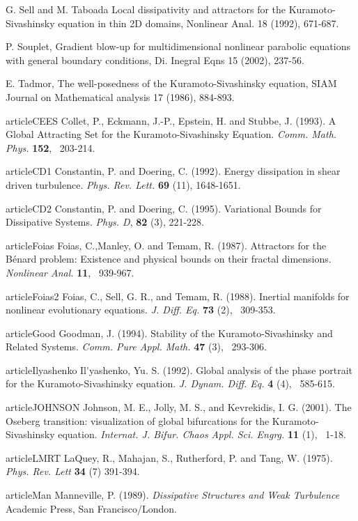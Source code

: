 G. Sell and M. Taboada Local dissipativity and attractors for the Kuramoto-Sivashinsky equation in thin 2D domains, Nonlinear Anal. 18 (1992), 671-687.

P. Souplet, Gradient blow-up for multidimensional nonlinear parabolic equations with general boundary conditions, Di. Inegral Eqns 15 (2002), 237-56.

E. Tadmor, The well-posedness of the Kuramoto-Sivashinsky equation, SIAM Journal on Mathematical analysis 17 (1986), 884-893.


article{CEES}
Collet, P., Eckmann, J.-P., Epstein, H. and Stubbe, J. (1993).
A Global Attracting Set for the Kuramoto-Sivashinsky Equation.
{\it Comm. Math. Phys.}
{\bf 152}, ~203-214.

article{CD1} Constantin, P. and Doering, C. (1992).
Energy dissipation in shear driven turbulence.
{\it Phys. Rev. Lett.} {\bf 69} (11), 1648-1651.

article{CD2} Constantin, P. and Doering, C. (1995).
Variational Bounds for Dissipative Systems.
{\it Phys. D}, {\bf 82} (3), 221-228.

article{Foias}
Foias, C.,Manley, O. and Temam, R. (1987).
Attractors for the B\'{e}nard problem:
Existence and physical bounds on their fractal dimensions.
{\it Nonlinear Anal.}
{\bf 11}, ~939-967.

article{Foias2}
Foias, C., Sell, G. R., and  Temam, R. (1988).
Inertial manifolds for nonlinear evolutionary equations.
{\it J. Diff. Eq.}
{\bf 73} (2), ~309-353.

article{Good}
Goodman, J. (1994).
Stability of the Kuramoto-Sivashinsky and Related Systems.
{\it Comm. Pure Appl. Math.}
{\bf 47} (3), ~293-306.

article{Ilyashenko}
Il\'{}yashenko, Yu. S. (1992).
Global analysis of the phase portrait for the Kuramoto-Sivashinsky equation.
{\it J. Dynam. Diff. Eq.}
{\bf 4}  (4), ~585-615.

article{JOHNSON}
 Johnson, M. E., Jolly, M. S., and  Kevrekidis, I. G. (2001).
The Oseberg transition: visualization of global bifurcations for the
Kuramoto-Sivashinsky equation.
{\it Internat. J. Bifur. Chaos Appl. Sci. Engrg.}
{\bf 11} (1), ~1-18.

article{LMRT} LaQuey, R., Mahajan, S., Rutherford, P. and Tang, W. (1975).
{\it Phys. Rev. Lett} {\bf 34} (7) 391-394.


article{Man} Manneville, P. (1989).
{\it Dissipative Structures and Weak Turbulence} Academic Press, San Francisco/London.

